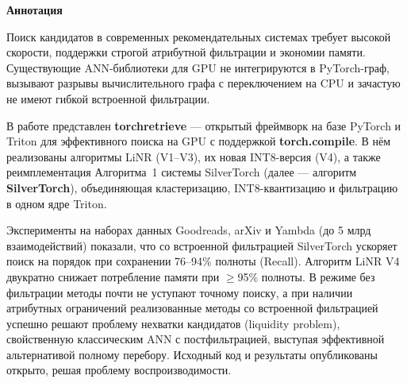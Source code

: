 \documentclass[14pt,a4paper]{extreport}
\numberwithin{figure}{chapter}
\numberwithin{table}{chapter}
\numberwithin{equation}{chapter}
\newcommand{\annotationpage}[2]{
    \clearpage
    \thispagestyle{empty}
    \begin{center}
        \textbf{#1}
    \end{center}

    #2
}
\begin{document}
\annotationpage{Аннотация}{
Поиск кандидатов в современных рекомендательных системах требует высокой скорости, поддержки строгой атрибутной фильтрации и экономии памяти. Существующие ANN-библиотеки для GPU не интегрируются в PyTorch-граф, вызывают разрывы вычислительного графа с переключением на CPU и зачастую не имеют гибкой встроенной фильтрации.

В работе представлен \textbf{torchretrieve} --- открытый фреймворк на базе PyTorch и Triton для эффективного поиска на GPU с поддержкой \textbf{torch.compile}. В нём реализованы алгоритмы LiNR (V1--V3), их новая INT8-версия (V4), а также реимплементация Алгоритма~1 системы SilverTorch \cite{xue2025silvertorch} (далее --- алгоритм \textbf{SilverTorch}), объединяющая кластеризацию, INT8-квантизацию и фильтрацию в одном ядре Triton.

Эксперименты на наборах данных Goodreads, arXiv и Yambda (до 5 млрд взаимодействий) показали, что со встроенной фильтрацией SilverTorch ускоряет поиск на порядок при сохранении 76--94\% полноты (Recall). Алгоритм LiNR V4 двукратно снижает потребление памяти при $\ge$95\% полноты. В режиме без фильтрации методы почти не уступают точному поиску, а при наличии атрибутных ограничений реализованные методы со встроенной фильтрацией успешно решают проблему нехватки кандидатов (liquidity problem), свойственную классическим ANN с постфильтрацией, выступая эффективной альтернативой полному перебору. Исходный код и результаты опубликованы открыто, решая проблему воспроизводимости.
}
\end{document}
